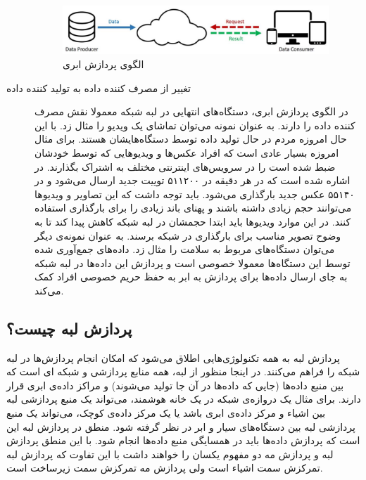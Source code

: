 \begin{description}
          \begin{figure}[h]
            \centerline{\includegraphics[width=10cm]{graphics/chapter_2/cloud_paradigm}}
            \caption{الگوی پردازش ابری \cite{shi2016edge}}
            \label{fig:chapter_2:cloud_paradigm}
          \end{figure}

        \item [تغییر از مصرف کننده داده به تولید کننده داده]
          در الگوی پردازش ابری، دستگاه‌های انتهایی در لبه شبکه معمولا نقش مصرف کننده داده را دارند.
          به عنوان نمونه می‌توان تماشای یک ویدیو را مثال زد.
          با این حال امروزه مردم در حال تولید داده توسط دستگاه‌هایشان هستند.
          برای مثال امروزه بسیار عادی است که افراد عکس‌ها و ویدیو‌هایی که توسط خودشان ضبط شده است را در سرویس‌های اینترنتی مختلف به اشتراک بگذارند.
          در \cite{2019domo} اشاره شده است که در هر دقیقه در  ۵۱۱۲۰۰ توییت جدید ارسال می‌شود و در  ۵۵۱۴۰ عکس جدید بارگذاری می‌شود.
          باید توجه داشت که این تصاویر و ویدیوها می‌توانند حجم زیادی داشته باشند و پهنای باند زیادی را برای بارگذاری استفاده کنند.
          در این موارد ویدیو‌ها باید ابتدا حجمشان در لبه شبکه کاهش پیدا کند تا به وضوح تصویر مناسب برای بارگذاری در شبکه برسند.
          به عنوان نمونه‌ی دیگر می‌توان دستگاه‌های مربوط به سلامت را مثال زد.
          داده‌های جمع‌آوری شده توسط این دستگاه‌ها معمولا خصوصی است و پردازش این داده‌ها در لبه شبکه به جای ارسال داده‌ها برای پردازش به ابر به حفظ حریم خصوصی افراد کمک می‌کند.

      \end{description}
    
    \subsection{پردازش لبه چیست؟}
      پردازش لبه به همه تکنولوژی‌هایی اطلاق می‌شود که امکان انجام پردازش‌ها در لبه شبکه را فراهم می‌کنند.
      در اینجا منظور از لبه، همه منابع پردازشی و شبکه ای است که بین منبع داده‌ها (جایی که داده‌ها در آن جا تولید می‌شوند) و مراکز داده‌ی ابری قرار دارند.
      برای مثال یک دروازه‌ی شبکه در یک خانه هوشمند، می‌تواند یک منبع پردازشی لبه بین اشیاء و مرکز داده‌ی ابری باشد یا یک مرکز داده‌ی کوچک، می‌تواند یک منبع پردازشی لبه بین دستگاه‌های سیار و ابر در نظر گرفته شود.
      منطق در پردازش لبه این است که پردازش داده‌ها باید در همسایگی منبع داده‌ها انجام شود.
      با این منطق پردازش لبه و پردازش مه\cite{} دو مفهوم یکسان را خواهند داشت با این تفاوت که پردازش لبه تمرکزش سمت اشیاء است ولی پردازش مه تمرکزش سمت زیرساخت است.

